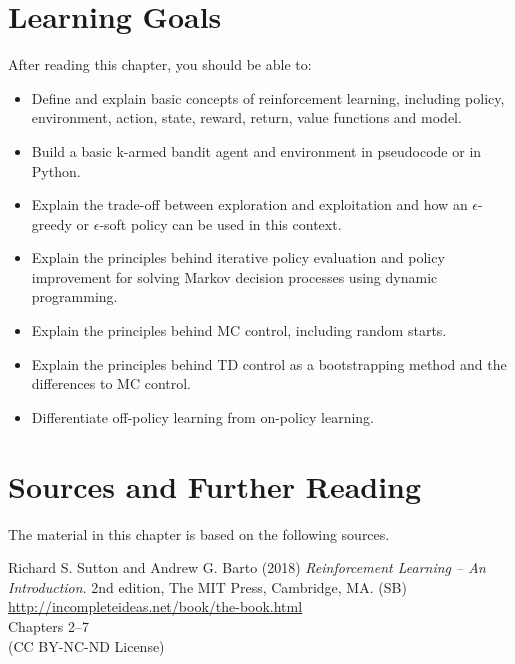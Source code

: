 %
%
\section*{Learning Goals}

After reading this chapter, you should be able to:
\begin{itemize}
    \item Define and explain basic concepts of reinforcement learning, including policy, environment, action, state, reward, return, value functions and model.
    \item Build a basic k-armed bandit agent and environment in pseudocode or in Python.
    \item  Explain the trade-off between exploration and exploitation and how an $\epsilon$-greedy or $\epsilon$-soft policy can be used in this context.
    \item Explain the principles behind iterative policy evaluation and policy improvement for solving Markov decision processes using dynamic programming.
    \item Explain the principles behind MC control, including random starts. 
    \item Explain the principles behind TD control as a bootstrapping method and the differences to MC control.   
    \item Differentiate off-policy learning from on-policy learning. 
\end{itemize}

\section*{Sources and Further Reading}

The material in this chapter is based on the following sources. 

\begin{tcolorbox}[colback=alert]
Richard S. Sutton and Andrew G. Barto (2018) \emph{Reinforcement Learning -- An Introduction}. 2nd edition, The MIT Press, Cambridge, MA. (SB) \\
\vspace{0.5\baselineskip}
\url{http://incompleteideas.net/book/the-book.html} \\
\vspace{0.5\baselineskip}
Chapters 2--7 \\
\vspace{0.5\baselineskip}
(CC BY-NC-ND License)
\end{tcolorbox}

